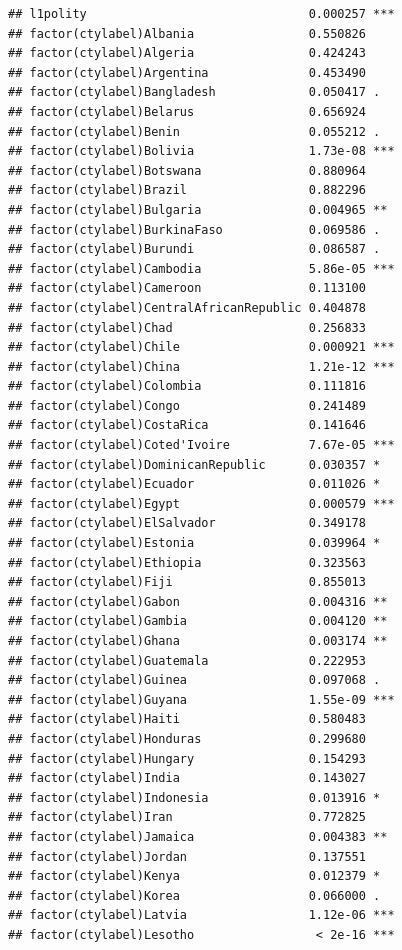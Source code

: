 \documentclass[12pt]{article}\usepackage[]{graphicx}\usepackage[]{color}
\makeatletter
\newenvironment{kframe}{%
 \def\at@end@of@kframe{}%
 \ifinner\ifhmode%
  \def\at@end@of@kframe{\end{minipage}}%
  \begin{minipage}{\columnwidth}%
 \fi\fi%
 \def\FrameCommand##1{\hskip\@totalleftmargin \hskip-\fboxsep
 \colorbox{shadecolor}{##1}\hskip-\fboxsep
     \hskip-\linewidth \hskip-\@totalleftmargin \hskip\columnwidth}%
 \MakeFramed {\advance\hsize-\width
   \@totalleftmargin\z@ \linewidth\hsize
   \@setminipage}}%
 {\par\unskip\endMakeFramed%
 \at@end@of@kframe}
\newenvironment{knitrout}{}{} %
\makeatother
\begin{document}
\begin{knitrout}
\begin{kframe}
\begin{verbatim}
## l1polity                               0.000257 ***
## factor(ctylabel)Albania                0.550826    
## factor(ctylabel)Algeria                0.424243    
## factor(ctylabel)Argentina              0.453490    
## factor(ctylabel)Bangladesh             0.050417 .  
## factor(ctylabel)Belarus                0.656924    
## factor(ctylabel)Benin                  0.055212 .  
## factor(ctylabel)Bolivia                1.73e-08 ***
## factor(ctylabel)Botswana               0.880964    
## factor(ctylabel)Brazil                 0.882296    
## factor(ctylabel)Bulgaria               0.004965 ** 
## factor(ctylabel)BurkinaFaso            0.069586 .  
## factor(ctylabel)Burundi                0.086587 .  
## factor(ctylabel)Cambodia               5.86e-05 ***
## factor(ctylabel)Cameroon               0.113100    
## factor(ctylabel)CentralAfricanRepublic 0.404878    
## factor(ctylabel)Chad                   0.256833    
## factor(ctylabel)Chile                  0.000921 ***
## factor(ctylabel)China                  1.21e-12 ***
## factor(ctylabel)Colombia               0.111816    
## factor(ctylabel)Congo                  0.241489    
## factor(ctylabel)CostaRica              0.141646    
## factor(ctylabel)Coted'Ivoire           7.67e-05 ***
## factor(ctylabel)DominicanRepublic      0.030357 *  
## factor(ctylabel)Ecuador                0.011026 *  
## factor(ctylabel)Egypt                  0.000579 ***
## factor(ctylabel)ElSalvador             0.349178    
## factor(ctylabel)Estonia                0.039964 *  
## factor(ctylabel)Ethiopia               0.323563    
## factor(ctylabel)Fiji                   0.855013    
## factor(ctylabel)Gabon                  0.004316 ** 
## factor(ctylabel)Gambia                 0.004120 ** 
## factor(ctylabel)Ghana                  0.003174 ** 
## factor(ctylabel)Guatemala              0.222953    
## factor(ctylabel)Guinea                 0.097068 .  
## factor(ctylabel)Guyana                 1.55e-09 ***
## factor(ctylabel)Haiti                  0.580483    
## factor(ctylabel)Honduras               0.299680    
## factor(ctylabel)Hungary                0.154293    
## factor(ctylabel)India                  0.143027    
## factor(ctylabel)Indonesia              0.013916 *  
## factor(ctylabel)Iran                   0.772825    
## factor(ctylabel)Jamaica                0.004383 ** 
## factor(ctylabel)Jordan                 0.137551    
## factor(ctylabel)Kenya                  0.012379 *  
## factor(ctylabel)Korea                  0.066000 .  
## factor(ctylabel)Latvia                 1.12e-06 ***
## factor(ctylabel)Lesotho                 < 2e-16 ***

\end{verbatim}
\end{kframe}
\end{knitrout}
\end{document}
